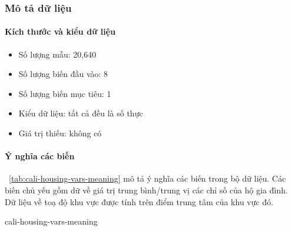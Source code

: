 \subsubsection{Mô tả dữ liệu}

\paragraph{Kích thước và kiểu dữ liệu}

\begin{itemize}
  \item Số lượng mẫu: 20,640
  \item Số lượng biến đầu vào: 8
  \item Số lượng biến mục tiêu: 1
  \item Kiểu dữ liệu: tất cả đều là số thực
  \item Giá trị thiếu: không có
\end{itemize}

\paragraph{Ý nghĩa các biến}

\tablename~\ref{tab:cali-housing-vars-meaning} mô tả ý nghĩa các biến trong bộ
dữ liệu. Các biến chủ yếu gồm dữ về giá trị trung bình/trung vị các chỉ số của
hộ gia đình. Dữ liệu về toạ độ khu vực được tính trên điểm trung tâm của khu
vực đó.

\begin{table}[htbp]
  \centering
  \caption{Mô tả các biến trong bộ dữ liệu California Housing}
  \label{tab:cali-housing-vars-meaning}
  {cali-housing-vars-meaning}
\end{table}
